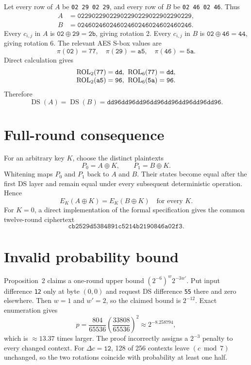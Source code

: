 \documentclass[10pt,twocolumn]{article}
\begin{document}
Let every row of $A$ be \texttt{02 29 02 29}, and every row of $B$ be \texttt{02 46 02 46}. Thus
\[
\begin{split}
A&=\texttt{02290229022902290229022902290229},\\
B&=\texttt{02460246024602460246024602460246}.
\end{split}
\]
Every $c_{i,j}$ in $A$ is $\texttt{02}\oplus\texttt{29}=\texttt{2b}$,
giving rotation 2. Every $c_{i,j}$ in $B$ is $\texttt{02}\oplus\texttt{46}=\texttt{44}$, giving rotation 6. The relevant AES S-box values are
\[
\pi(\texttt{02})=\texttt{77},\quad
\pi(\texttt{29})=\texttt{a5},\quad
\pi(\texttt{46})=\texttt{5a}.
\]
Direct calculation gives
\[
\begin{array}{c@{\;}c@{\;}c}
\operatorname{ROL}_2(\texttt{77})=\texttt{dd},&&
\operatorname{ROL}_6(\texttt{77})=\texttt{dd},\\
\operatorname{ROL}_2(\texttt{a5})=\texttt{96},&&
\operatorname{ROL}_6(\texttt{5a})=\texttt{96}.
\end{array}
\]
Therefore
\[
\operatorname{DS}(A)=\operatorname{DS}(B)
=\texttt{dd96dd96dd96dd96dd96dd96dd96dd96}.
\]

\section{Full-round consequence}

For an arbitrary key $K$, choose the distinct plaintexts
\[
P_0=A\oplus K,\qquad P_1=B\oplus K.
\]
Whitening maps $P_0$ and $P_1$ back to $A$ and $B$. Their states become equal after the first DS layer and remain equal under every subsequent deterministic operation. Hence
\[
E_K(A\oplus K)=E_K(B\oplus K)\quad\text{for every }K.
\]
For $K=0$, a direct implementation of the formal specification gives the common twelve-round ciphertext
\[
\texttt{cb2529d5384891c5214b2190846a02f3}.
\]


\section{Invalid probability bound}

Proposition~2 claims a one-round upper bound $(2^{-6})^w2^{-3w'}$. Put input difference \texttt{12} only at byte $(0,0)$ and request DS difference \texttt{55} there and zero elsewhere. Then $w=1$ and $w'=2$, so the claimed bound is $2^{-12}$. Exact enumeration gives
\[
p=\frac{804}{65536}\left(\frac{33808}{65536}\right)^2
\approx2^{-8.258794},
\]
which is $\approx 13.37$ times larger. The proof incorrectly assigns a $2^{-3}$ penalty to every changed context. For $\Delta c=\texttt{12}$, 128 of 256 contexts leave $(c\bmod7)$ unchanged, so the two rotations coincide with probability at least one half.
\end{document}

